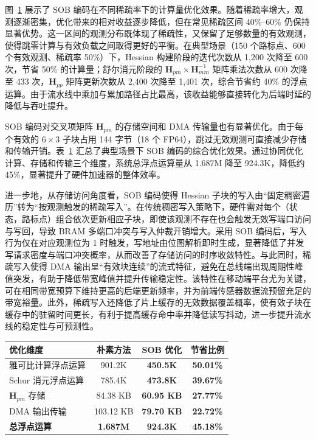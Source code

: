 \begin{figure}[h!t]
    \centering
    
    \label{fig:sob_computation}
\end{figure}

图~\ref{fig:sob_computation} 展示了 SOB 编码在不同稀疏率下的计算量优化效果。随着稀疏率增大，观测逐渐密集，优化带来的相对收益逐步降低，但在常见稀疏区间 40\%--60\% 仍保持显著优势。这一区间的观测分布既体现了稀疏性，又保留了足够数量的有效观测，使得跳零计算与有效负载之间取得更好的平衡。在典型场景（150 个路标点、600 个有效观测、稀疏率 50\%）下，Hessian 构建阶段的迭代次数从 1{,}200 次降至 600 次，节省 50\% 的计算量；舒尔消元阶段的 $\mathbf{H}_{pm} \times \mathbf{H}_{mm}^{-1}$ 矩阵乘法次数从 600 次降至 433 次，$\mathbf{H}_{pp}$ 矩阵更新次数从 2{,}400 次降至 1{,}401 次，综合节省约 40\% 的浮点运算。由于流水线中乘加与累加路径占比最高，该收益能够直接转化为后端时延的降低与吞吐提升。

SOB 编码对交叉项矩阵 $\mathbf{H}_{pm}$ 的存储空间和 DMA 传输量也有显著优化。由于每个有效的 $6 \times 3$ 子块占用 144 字节（18 个 FP64），跳过无效观测可直接减少存储和传输开销。表~\ref{tab:sob_summary} 汇总了典型场景下 SOB 编码的综合优化效果。通过协同优化计算、存储和传输三个维度，系统总浮点运算量从 1.687M 降至 924.3K，降低约 45\%，显著提升了硬件加速器的整体效率。

进一步地，从存储访问角度看，SOB 编码使得 Hessian 子块的写入由“固定稠密遍历”转为“按观测触发的稀疏写入”。在传统稠密写入策略下，硬件需对每个（状态，路标点）组合依次更新相应子块，即使该观测不存在也会触发无效写端口访问与写回，导致 BRAM 多端口冲突与写入仲裁开销增大。采用 SOB 编码后，写入行为仅在对应观测位为 1 时触发，写地址由位图解析即时生成，显著降低了并发写请求密度与端口冲突概率，从而改善了存储访问的时序收敛特性。与此同时，稀疏写入使得 DMA 输出呈“有效块连续”的流式特征，避免在总线端出现周期性峰值突发，有助于降低带宽峰值并提升传输稳定性。该特性在移动端平台尤为关键，可在相同带宽预算下维持更高的后端更新频率，并为前端传感器数据流预留充足的带宽裕量。此外，稀疏写入还降低了片上缓存的无效数据覆盖概率，使有效子块在缓存中的驻留时间更长，有利于提高缓存命中率并降低读写抖动，进一步提升流水线的稳定性与可预测性。

\begin{table}[htbp]
\centering
{}\label{tab:sob_summary}
\begin{tabular}{lccc}
\toprule
优化维度 & 朴素方法 & SOB 优化 & 节省比例 \\
\midrule
雅可比计算浮点运算 & 901.2K & \textbf{450.5K} & \textbf{50.01\%} \\
Schur 消元浮点运算 & 785.4K & \textbf{473.8K} & \textbf{39.67\%} \\
$\mathbf{H}_{pm}$ 存储 & 84.38 KB & \textbf{60.95 KB} & \textbf{27.77\%} \\
DMA 输出传输 & 103.12 KB & \textbf{79.70 KB} & \textbf{22.72\%} \\
\midrule
\textbf{总浮点运算} & \textbf{1.687M} & \textbf{924.3K} & \textbf{45.18\%} \\
\bottomrule
\end{tabular}
\end{table}

